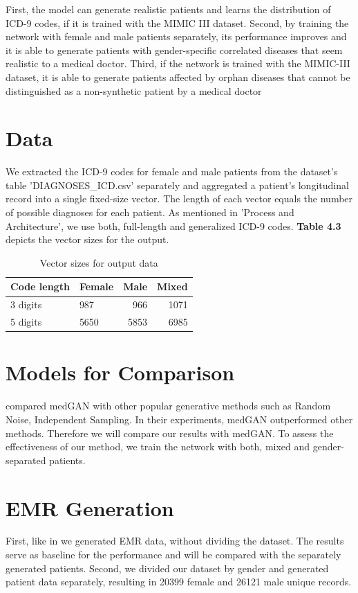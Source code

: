 \documentclass[11pt, a4paper, oneside]{book}
\begin{document}
First, the model can generate realistic patients and learns the distribution of ICD-9 codes, if it is trained with the MIMIC III dataset.
Second, by training the network with female and male patients separately, its performance improves and it is able to generate patients with gender-specific correlated diseases that seem realistic to a medical doctor.
Third, if the network is trained with the MIMIC-III dataset, it is able to generate patients affected by orphan diseases that cannot be distinguished as a non-synthetic patient by a medical doctor

\section{Data}
We extracted the ICD-9 codes for female and male patients from the dataset's table 'DIAGNOSES\_ICD.csv' separately and aggregated a patient’s longitudinal record into a single fixed-size vector. The length of each vector equals the number of possible diagnoses for each patient. As mentioned in 'Process and Architecture', we use both, full-length and generalized ICD-9 codes. \textbf{Table 4.3} depicts the vector sizes for the output.


\begin{table}
\begin{tabularx}{\textwidth}{X|l|r|r}
\textbf{Code length} & \textbf{Female} & \textbf{Male} & \textbf{Mixed}\\
\hline
3 digits  & 987 & 966 & 1071\\
5 digits & 5650 & 5853 & 6985\\
\end{tabularx}
\caption{Vector sizes for output data}
\end{table}


\section{Models for Comparison}
\citep{Choi2017} compared medGAN with other popular generative methods such as Random Noise, Independent Sampling. In their experiments, medGAN outperformed other methods. Therefore we will compare our results with medGAN. To assess the effectiveness of our method, we train the network with both, mixed and gender-separated patients. 

\section{EMR Generation}
First, like in \citep{Choi2017} we generated EMR data, without dividing the dataset. The results serve as baseline for the performance and will be compared with the separately generated patients.
Second, we divided our dataset by gender and generated patient data separately, resulting in 20399 female and 26121 male unique records.
\\
\end{document}
